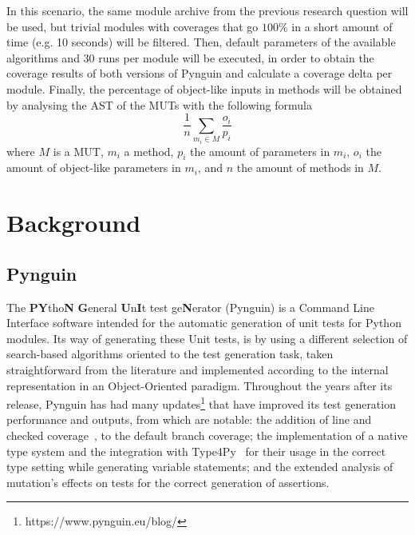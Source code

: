 \documentclass[%
  chapterprefix=false,%
  open=right,%
  twoside=true,%
  paper=a4,%
  logofile={Figures/logo.png},%
  thesistype=master,%
  UKenglish,%
]{se2thesis}
\begin{document}

In this scenario, the same module archive from the previous research question will be used, but trivial modules with coverages that go \(100\%\) in a short amount of time (e.g. 10 seconds) will be filtered.
Then, default parameters of the available algorithms and 30 runs per module will be executed, in order to obtain the coverage results of both versions of Pynguin and calculate a coverage delta per module.
Finally, the percentage of object-like inputs in methods will be obtained by analysing the AST of the MUTs with the following formula
\[ \frac{1}{n}\sum_{m_i \in M} \frac{o_i}{p_i}\]
where \(M\) is a MUT, \(m_i\) a method, \(p_i\) the amount of parameters in \(m_i\), \(o_i\) the amount of object-like parameters in \(m_i\), and \(n\) the amount of methods in \(M\). 


\chapter{Background}

\section{Pynguin}

The \textbf{PY}tho\textbf{N} \textbf{G}eneral \textbf{U}n\textbf{I}t test ge\textbf{N}erator (Pynguin) is a Command Line Interface software intended for the automatic generation of unit tests for Python modules.
Its way of generating these Unit tests, is by using a different selection of search-based algorithms oriented to the test generation task, taken straightforward from the literature and implemented according to the internal representation in an Object-Oriented paradigm.
Throughout the years after its release, Pynguin has had many updates\footnote{https://www.pynguin.eu/blog/} that have improved its test generation performance and outputs, from which are notable: the addition of line and checked coverage~\cite{DBLP:conf/icst/SchulerZ11}, to the default branch coverage; the implementation of a native type system and the integration with Type4Py~\cite{DBLP:conf/icse/MirLPG22} for their usage in the correct type setting while generating variable statements; and the extended analysis of mutation's effects on tests for the correct generation of assertions.
\end{document}
